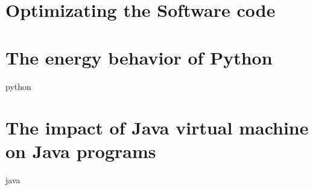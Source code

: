 \newpage
\chapter{Optimizating the Software code}
\label{chapter:optimization}
% 

\chapter{The energy behavior of Python}
\label{chapter:python}
{python}

\chapter{The impact of Java virtual machine on Java programs}
\label{chapter:java}
{java}